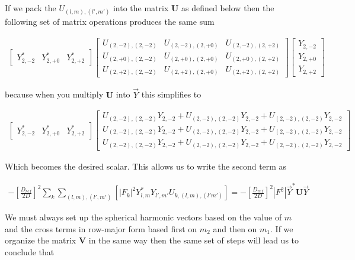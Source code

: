 If we pack the $U_{(l,m),(l',m')}$ into the matrix $\mathbf{U}$ as defined below then the following set of matrix operations produces the same sum

\begin{align*}
\begin{bmatrix}
Y_{2,-2}^{*} &Y_{2,+0}^{*}  &Y_{2,+2}^{*}   
\end{bmatrix}
\begin{bmatrix}
U_{(2,-2),(2,-2)} &  U_{(2,-2),(2,+0)} &  U_{(2,-2),(2,+2)} \\
U_{(2,+0),(2,-2)} &  U_{(2,+0),(2,+0)} &  U_{(2,+0),(2,+2)} \\
U_{(2,+2),(2,-2)} &  U_{(2,+2),(2,+0)} &  U_{(2,+2),(2,+2)}
\end{bmatrix}
\begin{bmatrix}
Y_{2,-2} \\
Y_{2,+0} \\
Y_{2,+2}
\end{bmatrix}
\end{align*}

because when you multiply $\mathbf{U}$ into $\vec{Y}$ this simplifies to 



\begin{align*}
\begin{bmatrix}
Y_{2,-2}^{*} &Y_{2,+0}^{*}  &Y_{2,+2}^{*}   
\end{bmatrix}
\begin{bmatrix}
U_{(2,-2),(2,-2)} Y_{2,-2} + U_{(2,-2),(2,-2)}Y_{2,-2} + U_{(2,-2),(2,-2)}Y_{2,-2} \\ 
U_{(2,-2),(2,-2)} Y_{2,-2} + U_{(2,-2),(2,-2)}Y_{2,-2} + U_{(2,-2),(2,-2)}Y_{2,-2} \\ 
U_{(2,-2),(2,-2)} Y_{2,-2} + U_{(2,-2),(2,-2)}Y_{2,-2} + U_{(2,-2),(2,-2)}Y_{2,-2} 
\end{bmatrix}
\end{align*}

Which becomes the desired scalar. This allows us to write the second term as

\begin{align}
- \left[\frac{D_{ref}}{2D}\right]^{2}\sum_{k}\sum_{(l,m),(l',m')}\left[|F_k|^2 Y_{l,m}^{*}Y_{l',m'}U_{k,(l,m),(l'm')}\right] =  - \left[\frac{D_{ref}}{2D}\right]^{2} |F^2|\vec{Y}^{*}\mathbf{U}\vec{Y}
\end{align}

We must always set up the spherical harmonic vectors based on the value of $m$ and the cross terms in row-major form based first on $m_2$ and then on $m_1$. If we organize the matrix $\mathbf{V}$ in the same way then the same set of steps will lead us to conclude that  


